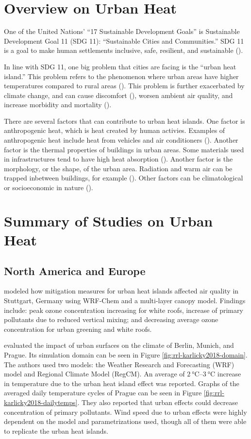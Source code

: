 \section{Overview on Urban Heat}
	One of the United Nations’ ``17 Sustainable Development Goals'' is Sustainable Development Goal 11 (SDG 11): ``Sustainable Cities and Communities.'' 
	SDG 11 is a goal to make human settlements inclusive, safe, resilient, and sustainable (\cite{UN2015}).
	
	In line with SDG 11, one big problem that cities are facing is the ``urban heat island.'' 
	This problem refers to the phenomenon where urban areas have higher temperatures compared to rural areas (\cite{Khan2021}).
	This problem is further exacerbated by climate change, and can cause discomfort (\cite{Bhati2018}), worsen ambient air quality, and increase morbidity and mortality (\cite {Khan2021}).
	
	There are several factors that can contribute to urban heat islands.
	One factor is anthropogenic heat, which is heat created by human activies.
	Examples of anthropogenic heat include heat from vehicles and air conditioners (\cite{Kim2021}).
	Another factor is the thermal properties of buildings in urban areas. 
	Some materials used in infrastructures tend to have high heat absorption (\cite{Kim2021}). 
	Another factor is the morphology, or the shape, of the urban area.
	Radiation and warm air can be trapped inbetween buildings, for example (\cite{Wang2023}). 
	Other factors can be climatological or socioeconomic in nature (\cite{Khan2021}).

\section{Summary of Studies on Urban Heat}	
	\subsection{North America and Europe}
		\textcite{Fallmann2016} modeled how mitigation measures for urban heat islands affected air quality in Stuttgart, Germany using WRF-Chem and a multi-layer canopy model. Findings include: 
			peak ozone concentration increasing for white roofs, 
			increase of primary pollutants due to reduced vertical mixing; and 
			decreasing average ozone concentration for urban greening and white roofs.
		
		\textcite{Karlicky2018} evaluated the impact of urban surfaces on the climate of Berlin, Munich, and Prague.
		Its simulation domain can be seen in Figure \ref{fig:rrl-karlicky2018-domain}.
		The authors used two models: the Weather Research and Forecasting (WRF) model and Regional Climate Model (RegCM).
		An average of $\qtyrange{2}{3}{\degreeCelsius}$ increase in temperature due to the urban heat island effect was reported.
		Graphs of the averaged daily temperature cycles of Prague can be seen in Figure \ref{fig:rrl-karlicky2018-dailytemps}.
		They also reported that urban effects could decrease concentration of primary pollutants.
		Wind speed due to urban effects were highly dependent on the model and parametrizations used, though all of them were able to replicate the urban heat islands.
		
